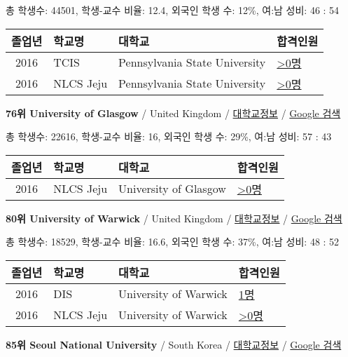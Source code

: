 \documentclass[13pt,]{article}
\begin{document}
총 학생수: 44501, 학생-교수 비율: 12.4, 외국인 학생 수: 12\%, 여:남
성비: 46 : 54

\begin{longtable}[]{@{}clll@{}}
\toprule
졸업년 & 학교명 & 대학교 & 합격인원\tabularnewline
\midrule
\endhead
2016 & TCIS & Pennsylvania State University &
\href{http://cafe.naver.com/assarabia/11598}{\textgreater{}0명}\tabularnewline
2016 & NLCS Jeju & Pennsylvania State University &
\href{http://cafe.naver.com/assarabia/11592}{\textgreater{}0명}\tabularnewline
\bottomrule
\end{longtable}

\textbf{76위 University of Glasgow} / United Kingdom /
\href{https://www.timeshighereducation.com/world-university-rankings/university-of-glasgow?ranking-dataset=133819}{대학교정보}
/ \href{http://www.google.com/search?q=University+of+Glasgow}{Google
검색}

총 학생수: 22616, 학생-교수 비율: 16, 외국인 학생 수: 29\%, 여:남 성비:
57 : 43

\begin{longtable}[]{@{}clll@{}}
\toprule
졸업년 & 학교명 & 대학교 & 합격인원\tabularnewline
\midrule
\endhead
2016 & NLCS Jeju & University of Glasgow &
\href{http://cafe.naver.com/assarabia/11592}{\textgreater{}0명}\tabularnewline
\bottomrule
\end{longtable}

\textbf{80위 University of Warwick} / United Kingdom /
\href{https://www.timeshighereducation.com/world-university-rankings/university-of-warwick?ranking-dataset=133819}{대학교정보}
/ \href{http://www.google.com/search?q=University+of+Warwick}{Google
검색}

총 학생수: 18529, 학생-교수 비율: 16.6, 외국인 학생 수: 37\%, 여:남
성비: 48 : 52

\begin{longtable}[]{@{}clll@{}}
\toprule
졸업년 & 학교명 & 대학교 & 합격인원\tabularnewline
\midrule
\endhead
2016 & DIS & University of Warwick &
\href{http://cafe.naver.com/assarabia/11591}{1명}\tabularnewline
2016 & NLCS Jeju & University of Warwick &
\href{http://cafe.naver.com/assarabia/11592}{\textgreater{}0명}\tabularnewline
\bottomrule
\end{longtable}

\textbf{85위 Seoul National University} / South Korea /
\href{https://www.timeshighereducation.com/world-university-rankings/seoul-national-university?ranking-dataset=133819}{대학교정보}
/ \href{http://www.google.com/search?q=Seoul+National+University}{Google
검색}
\end{document}
